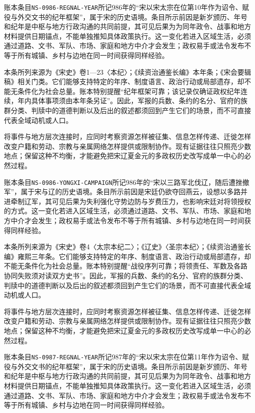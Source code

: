 账本条目\texttt{NS-0986-REGNAL-YEAR}所记986年的“宋以宋太宗在位第10年作为诏令、赋役与外交文书的纪年框架”，属于宋的历史语境。条目所示前因是新岁颁历、年号和纪年是中枢与地方行政沟通的共同前提，其可见后果为为同年政令、战事和地方材料提供日期锚点，不能单独推知具体政策执行。这一变化若进入区域生活，必须通过道路、文书、军队、市场、家庭和地方中介才会发生；政权易手或法令发布不等于所有城镇、乡村与边地在同一时间获得同样经验。

本条所列来源为《宋史》卷1—23〈本纪〉；《续资治通鉴长编》本年条；《宋会要辑稿》相关门类。它们能够支持特定的年序、制度语言、政治行动或局部遗存，却不能无条件化为社会总量。账本特别提醒“纪年框架可靠；该记录仅确证政权纪年连续，年内具体事项须由本年条另证”。因此，军报的兵数、条约的名分、官府的族群分类、判牍中的道德判断以及后出的叙述都须回到产生它们的场景，而不可直接代表全域动机或人口。

将事件与地方层次连接时，应同时考察资源怎样被征集、信息怎样传递、迁徙怎样改变户籍和劳动、宗教与亲属网络怎样提供或限制协作。现有证据往往只照亮少数地点；保留这种不均衡，才能避免把宋辽夏金元的多政权历史改写成单一中心的必然过程。

账本条目\texttt{NS-0986-YONGXI-CAMPAIGN}所记986年的“宋以三路军北伐辽，随后遭挫撤军”，属于宋与辽的历史语境。条目所示前因是宋廷仍欲夺回燕云，设想以多路并进牵制辽军，其可见后果为失利强化守势边防与岁费压力，也影响宋廷对将领授权的方式。这一变化若进入区域生活，必须通过道路、文书、军队、市场、家庭和地方中介才会发生；政权易手或法令发布不等于所有城镇、乡村与边地在同一时间获得同样经验。

本条所列来源为《宋史》卷4〈太宗本纪二〉；《辽史》〈圣宗本纪〉；《续资治通鉴长编》雍熙三年条。它们能够支持特定的年序、制度语言、政治行动或局部遗存，却不能无条件化为社会总量。账本特别提醒“战役序列可靠；将领责任、军数及各路协同失败须对读双方史书”。因此，军报的兵数、条约的名分、官府的族群分类、判牍中的道德判断以及后出的叙述都须回到产生它们的场景，而不可直接代表全域动机或人口。

将事件与地方层次连接时，应同时考察资源怎样被征集、信息怎样传递、迁徙怎样改变户籍和劳动、宗教与亲属网络怎样提供或限制协作。现有证据往往只照亮少数地点；保留这种不均衡，才能避免把宋辽夏金元的多政权历史改写成单一中心的必然过程。

账本条目\texttt{NS-0987-REGNAL-YEAR}所记987年的“宋以宋太宗在位第11年作为诏令、赋役与外交文书的纪年框架”，属于宋的历史语境。条目所示前因是新岁颁历、年号和纪年是中枢与地方行政沟通的共同前提，其可见后果为为同年政令、战事和地方材料提供日期锚点，不能单独推知具体政策执行。这一变化若进入区域生活，必须通过道路、文书、军队、市场、家庭和地方中介才会发生；政权易手或法令发布不等于所有城镇、乡村与边地在同一时间获得同样经验。

